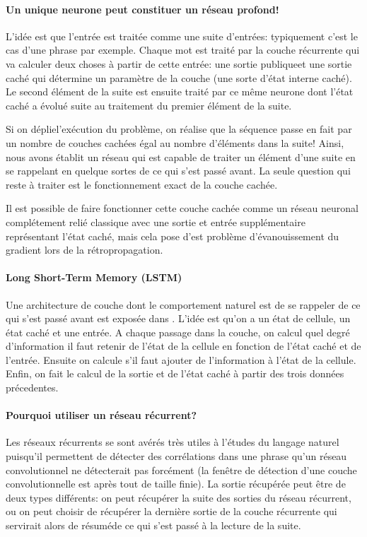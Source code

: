 \documentclass[a4paper,11pt, twocolumn]{article}
\begin{document}
\paragraph{Un unique neurone peut constituer un réseau profond!}

L'idée est que l'entrée est traitée comme une suite d'entrées:
typiquement c'est le cas d'une phrase par exemple. Chaque mot est traité par la
couche récurrente qui va calculer deux choses à partir de cette entrée: une
sortie \og publique\fg et une sortie caché qui détermine un paramètre de la
couche (une sorte d'état interne caché). Le second élément de la suite est
ensuite traité par ce même neurone dont l'état caché a évolué suite au
traitement du premier élément de la suite.

Si on \og déplie\fg l'exécution du problème, on réalise que la séquence passe en
fait par un nombre de couches cachées égal au nombre d'éléments dans la suite!
Ainsi, nous avons établit un réseau qui est capable de traiter un élément d'une
suite en se rappelant en quelque sortes de ce qui s'est passé avant. La seule
question qui reste à traiter est le fonctionnement exact de la couche cachée.

Il est possible de faire fonctionner cette couche cachée comme un réseau neuronal
complétement relié classique avec une sortie et entrée supplémentaire
représentant l'état caché, mais cela pose d'est problème d'évanouissement du
gradient lors de la rétropropagation.

\paragraph{Long Short-Term Memory (LSTM)}

Une architecture de couche dont le comportement naturel est de se rappeler de ce
qui s'est passé avant est exposée dans . L'idée est qu'on a un état de
cellule, un état caché et une entrée. A chaque passage dans la couche, on calcul
quel degré d'information il faut retenir de l'état de la cellule en fonction de
l'état caché et de l'entrée. Ensuite on calcule s'il faut ajouter de
l'information à l'état de la cellule. Enfin, on fait le calcul de la sortie et
de l'état caché à partir des trois données précedentes.

\paragraph{Pourquoi utiliser un réseau récurrent?}

Les réseaux récurrents se sont avérés très utiles à l'études du langage naturel
puisqu'il permettent de détecter des corrélations dans une phrase qu'un réseau
convolutionnel ne détecterait pas forcément (la fenêtre de détection d'une
couche convolutionnelle est après tout de taille finie).  La sortie récupérée
peut être de deux types différents: on peut récupérer la suite des sorties du
réseau récurrent, ou on peut choisir de récupérer la dernière sortie de la
couche récurrente qui servirait alors de \og résumé\fg de ce qui s'est passé à
la lecture de la suite.
\end{document}

